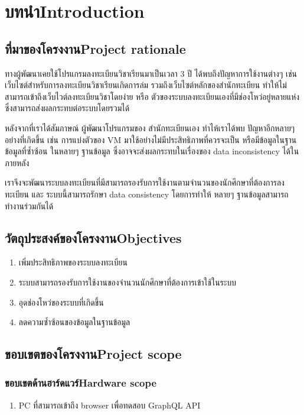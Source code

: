 \chapter{\ifcpe บทนำ\else Introduction\fi}

\section{\ifcpe ที่มาของโครงงาน\else Project rationale\fi}

\enskip ทางผู้พัฒนาเคยใช้โปรแกรมลงทะเบียนวิชาเรียนมาเป็นเวลา 3 ปี ได้พบถึงปัญหาการใช้งานต่างๆ เช่น เว็บไซต์สำหรับการลงทะเบียนวิชาเรียนเกิดการล่ม รวมถึงเว็บไซต์หลักของสำนักทะเบียน ทำให้ไม่สามารถเข้าถึงเว็บไวต์ลงทะเบียนวิชาโดยง่าย หรือ ตัวของระบบลงทะเบียนเองที่มีช่องโหว่อยู่หลายแห่ง ซึ่งสามารถส่งผลกระทบต่อระบบโดยรวมได้

หลังจากที่เราได้สัมภาษณ์ ผู้พัฒนาโปรแกรมของ สำนักทะเบียนเอง ทำไห้เราได้พบ ปัญหาอีกหลายๆ อย่างที่เกิดขึ้น เช่น การแบ่งตัวของ VM \cite{vm} มาใช้อย่างไม่มีประสิทธิภาพที่ควรจะเป็น หรือมีข้อมูลในฐานข้อมูลที่ซ้ำซ้อน ในหลายๆ ฐานข้อมูล ซึ่งอาจจะส่งผลกระทบในเรื่องของ data inconsistency ได้ในภายหลัง

เราจึงจะพัฒนาระบบลงทะเบียนที่มีสามารถรองรับการใช้งานตามจำนวนของนักศึกษาที่ต้องการลงทะเบียน และ ระบบนี้สามารถรักษา data consistency โดยการทำให้ หลายๆ ฐานข้อมูลสามารถทำงานร่วมกันได้

\section{\ifcpe วัตถุประสงค์ของโครงงาน\else Objectives\fi}
\begin{enumerate}
    \item เพิ่มประสิทธิภาพของระบบลงทะเบียน
    \item ระบบสามารถรองรับการใช้งานของจำนวนนักศึกษาที่ต้องการเข้าใช้ในระบบ
    \item อุดช่องโหว่ของระบบที่เกิดขึ้น
    \item ลดความซ้ำซ้อนของข้อมูลในฐานข้อมูล
\end{enumerate}

\section{\ifcpe ขอบเขตของโครงงาน\else Project scope\fi}

\subsection{\ifcpe ขอบเขตด้านฮาร์ดแวร์\else Hardware scope\fi}
\begin{enumerate}
    \item PC ที่สามารถเข้าถึง browser เพื่อทดสอบ GraphQL API
\end{enumerate}
